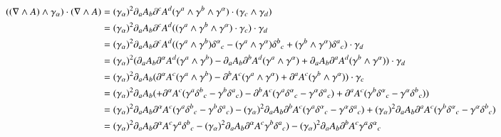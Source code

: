 \documentclass{article}
\begin{document}
\begin{align*}
((\grad \wedge A) \wedge \gamma_\alpha) \cdot (\grad \wedge A)
&= 
(\gamma_\alpha)^2 
\partial_{a} A_{b} 
\partial^{c} A^{d} 
(\gamma^{a} \wedge \gamma^{b} \wedge \gamma^{\alpha}) \cdot 
(\gamma_{c} \wedge \gamma_{d})
\\
&= 
(\gamma_\alpha)^2 
\partial_{a} A_{b} 
\partial^{c} A^{d} 
((\gamma^{a} \wedge \gamma^{b} \wedge \gamma^{\alpha}) \cdot \gamma_{c} ) \cdot \gamma_{d}
\\
&= 
(\gamma_\alpha)^2 
\partial_{a} A_{b} 
\partial^{c} A^{d} 
(
(\gamma^{a} \wedge \gamma^{b}) {\delta^{\alpha}}_{c}
-(\gamma^{a} \wedge \gamma^{\alpha}) {\delta^{b}}_{c}
+(\gamma^{b} \wedge \gamma^{\alpha}) {\delta^{a}}_{c}
) \cdot \gamma_{d}
\\
&= 
(\gamma_\alpha)^2 (
\partial_{a} A_{b} \partial^{\alpha} A^{d} (\gamma^{a} \wedge \gamma^{b}) 
-\partial_{a} A_{b} \partial^{b} A^{d} (\gamma^{a} \wedge \gamma^{\alpha}) 
+\partial_{a} A_{b} \partial^{a} A^{d} (\gamma^{b} \wedge \gamma^{\alpha}) 
) \cdot \gamma_{d}
\\
&= 
(\gamma_\alpha)^2 
\partial_{a} A_{b}
( \partial^{\alpha} A^{c} 
(\gamma^{a} \wedge \gamma^{b}) 
- \partial^{b} A^{c} (\gamma^{a} \wedge \gamma^{\alpha}) 
+ \partial^{a} A^{c} (\gamma^{b} \wedge \gamma^{\alpha}) 
) \cdot \gamma_{c}
\\
&= 
(\gamma_\alpha)^2 
\partial_{a} A_{b}
( 
+ \partial^{\alpha} A^{c}
(\gamma^{a} {\delta^{b}}_{c} -\gamma^{b} {\delta^{a}}_{c})
- \partial^{b} A^{c} 
(\gamma^{a} {\delta^{\alpha}}_{c} -\gamma^{\alpha} {\delta^{a}}_{c})
+ \partial^{a} A^{c} 
(\gamma^{b} {\delta^{\alpha}}_{c} -\gamma^{\alpha} {\delta^{b}}_{c})
) 
\\
&= 
 (\gamma_\alpha)^2 \partial_{a} A_{b} \partial^{\alpha} A^{c} (\gamma^{a} {\delta^{b}}_{c} -\gamma^{b} {\delta^{a}}_{c})
-(\gamma_\alpha)^2 \partial_{a} A_{b} \partial^{b} A^{c} (\gamma^{a} {\delta^{\alpha}}_{c} -\gamma^{\alpha} {\delta^{a}}_{c})
+(\gamma_\alpha)^2 \partial_{a} A_{b} \partial^{a} A^{c} (\gamma^{b} {\delta^{\alpha}}_{c} -\gamma^{\alpha} {\delta^{b}}_{c})
\\
&= 
(\gamma_\alpha)^2 \partial_{a} A_{b} \partial^{\alpha} A^{c} \gamma^{a} {\delta^{b}}_{c}
-(\gamma_\alpha)^2 \partial_{a} A_{b} \partial^{\alpha} A^{c} \gamma^{b} {\delta^{a}}_{c})
%
-(\gamma_\alpha)^2 \partial_{a} A_{b} \partial^{b} A^{c} \gamma^{a} {\delta^{\alpha}}_{c}

\end{align*}
\end{document}
